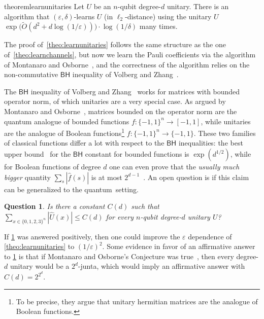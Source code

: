 \documentclass[11pt]{article}
\newcommand{\eps}{\varepsilon}
\newcommand{\BH}{\textsf{BH}}
\theoremstyle{plain}
\theoremstyle{plain}
\newtheorem{question}[theorem]{Question}
\theoremstyle{definition}
\theoremstyle{remark}
\theoremstyle{named}
\begin{document}
\begin{restatable}{theorem}{learnunitaries}\label{theo:learnunitaries}
    Let $U$ be an $n$-qubit degree-$d$  unitary. There is an algorithm that $(\varepsilon,
    \delta)$-learns $U$ (in $\ell_2$-distance) using the unitary $U$  
    $
    \exp\big(\widetilde{O}(d^2+d\log (1/\varepsilon))\big)\cdot \log(1/\delta)
    $  many times.
\end{restatable}
The proof of~\cref{theo:learnunitaries} follows the same structure as the one of~\cref{theo:learnchannels}, but now we learn the Pauli coefficients via the algorithm of Montanaro and Osborne~\cite{montanaro2008quantum}, and the correctness of the algorithm relies on the non-commutative $\BH$ inequality of Volberg and Zhang~\cite{volberg2023noncommutative}. 

The $\BH$ inequality of Volberg and Zhang~\cite{volberg2023noncommutative} works for matrices with bounded operator norm, of which unitaries are a very special case. 
As argued by Montanaro and Osborne~\cite{montanaro2008quantum}, matrices bounded on the operator norm are the quantum analogue of bounded functions $f:\{-1,1\}^n\to [-1,1]$, while unitaries are the  analogue of Boolean functions\footnote{To be precise, they argue that unitary hermitian matrices are the analogue of Boolean functions.} $f:\{-1,1\}^n\to \{-1,1\}$. These two families of classical functions differ a lot with respect to the $\BH$ inequalities: the best upper bound~\cite{defant2019fourier} for the $\BH$ constant for bounded functions is $\exp({d^{1/2}})$, while for Boolean functions of degree $d$ one can even prove that the \emph{usually much bigger} quantity $\sum_{s}|\widehat f(s)|$ is at most $2^{d-1}$~\cite[Exercise 1.11]{o2014analysis}. An open question is if this claim can be generalized to the quantum~setting. 

\begin{question}\label{que:unitariesaresparse}
    Is there a constant $C(d)$ such that $\sum_{x\in \{0,1,2,3\}^n} |\widehat U(x)|\leq C(d)$  for every $n$-qubit degree-$d$ unitary $U$?
\end{question}
If \cref{que:unitariesaresparse} was answered positively, then one could improve the $\eps$ dependence of \cref{theo:learnunitaries} to $(1/\eps)^{2}$. Some evidence in favor of an affirmative answer to \cref{que:unitariesaresparse} is that if Montanaro and Osborne's Conjecture was true~\cite[Conjecture~4]{montanaro2008quantum}, then every degree-$d$ unitary would be a $2^d$-junta, which would imply an affirmative answer with $C(d)=2^{2^d}$. 
\end{document}
